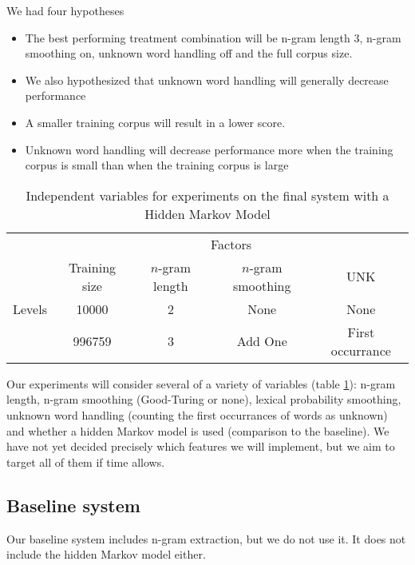 \documentclass{article}
\begin{document}
We had four hypotheses
\begin{itemize}
\item The best performing treatment combination will be n-gram length 3,
n-gram smoothing on, unknown word handling off and the full corpus size.
\item We also hypothesized that unknown word handling will generally
decrease performance
\item A smaller training corpus will result in a lower score.
\item Unknown word handling will decrease performance more when the
training corpus is small than when the training corpus is large
\end{itemize}

\begin{table}
\begin{tabular}{lcccc}
& \multicolumn{4}{c}{Factors} \\
\cmidrule{2-5}
       & Training size & $n$-gram length & $n$-gram smoothing & UNK\\
\cmidrule{2-5}
Levels &  10000   &  2  & None    & None \\
       & 996759   &  3  & Add One & First occurrance  \\
\cmidrule{2-5}
\end{tabular}
\caption{\label{tab:ind_vars}Independent variables for experiments on the final system with a Hidden Markov Model}
\end{table}

Our experiments will consider several of a variety of variables (table \ref{tab:ind_vars}): n-gram length,
n-gram smoothing (Good-Turing or none), lexical probability smoothing, unknown
word handling (counting the first occurrances of words as unknown) and
whether a hidden Markov model is used (comparison to the baseline).
We have not yet decided precisely which features we will implement, but we
aim to target all of them if time allows.

\subsection{Baseline system}
Our baseline system includes n-gram extraction,
but we do not use it.
It does not include the hidden Markov model either.
\end{document}

